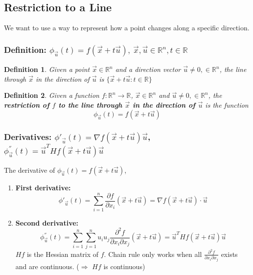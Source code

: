 \documentclass[11pt,a4paper]{article}
\newtheorem{definition}{Definition}
\begin{document}
\subsection{ Restriction to a Line}
We want to use a way to represent how a point changes along a specific direction.
\subsubsection{ Definition: $\phi_{\vec{u}}(t)=f(\vec{x}+t\vec{u}),\ \vec{x},\vec{u}\in \mathbb{R}^n, t\in \mathbb{R}$}
\begin{definition}
    Given a point $\vec{x}\in \mathbb{R}^n$ and a direction vector $\vec{u}\neq 0, \in \mathbb{R}^n$, the line through $\vec{x}$ in the direction of $\vec{u}$ is $\{\vec{x}+t \vec{u}: t\in \mathbb{R}\}$
\end{definition}

\begin{definition}
    Given a function $f: \mathbb{R}^n \rightarrow \mathbb{R}$, $\vec{x}\in \mathbb{R}^n$ and $\vec{u}\neq 0, \in \mathbb{R}^n$, the \textbf{restriction of $f$ to the line through $\vec{x}$ in the direction of $\vec{u}$} is the function $$\phi_{\vec{u}}(t)=f(\vec{x}+t\vec{u})$$
\end{definition}

\subsubsection{Derivatives: $\phi'_{\vec{u}}(t)=\nabla f(\vec{x}+t\vec{u})\vec{u}$, $\phi^{''}_{\vec{u}} (t)=\vec{u}^T {Hf}(\vec{x}+t\vec{u})\vec{u}$}
The derivative of $\phi_{\vec{u}}(t)=f(\vec{x}+t\vec{u})$,
\begin{enumerate}
    \item \textbf{First derivative:}$$\phi'_{\vec{u}}(t)=\sum_{i=1}^n \frac{\partial f}{\partial x_i}(\vec{x}+t\vec{u})=\nabla f(\vec{x}+t\vec{u})\cdot \vec{u}$$
    \item \textbf{Second derivative:} $$\phi^{''}_{\vec{u}} (t)=\sum_{i=1}^n \sum_{j=1}^n u_iu_j\frac{\partial^2 f}{\partial x_i\partial x_j}(\vec{x}+t\vec{u})=\vec{u}^T {Hf}(\vec{x}+t\vec{u})\vec{u}$$
    $Hf$ is the Hessian matrix of $f$. Chain rule only works when all $\frac{\partial^2 f}{\partial x_i\partial x_j}$ exists and are continuous. ($\Rightarrow$ $Hf$ is continuous)
\end{enumerate}
\end{document}
